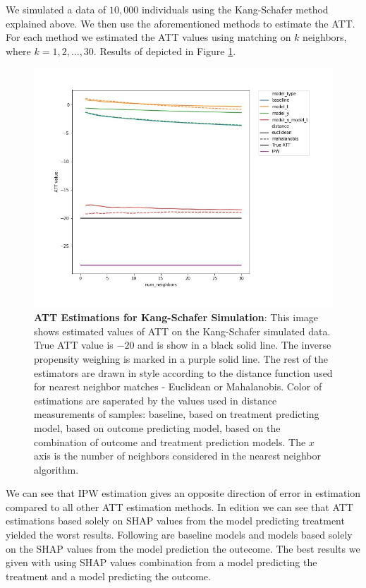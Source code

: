 \documentclass{article}
\begin{document}

We simulated a data of $10,000$ individuals using the Kang-Schafer method explained above. We then use the aforementioned methods to estimate the ATT. For each method we estimated the ATT values using matching on $k$ neighbors, where $k=1,2,...,30$. Results of depicted in Figure \ref{fig:kang_schafer}.

\begin{figure}
    \centering
    \includegraphics[width=\textwidth]{Paper/images/kang_schafer_ATE_estimations_by_neighbor.jpg}
    \caption{\textbf{ATT Estimations for Kang-Schafer Simulation}: This image shows estimated values of ATT on the Kang-Schafer simulated data. True ATT value is $-20$ and is show in a black solid line. The inverse propensity weighing is marked in a purple solid line. The rest of the estimators are drawn in style according to the distance function used for nearest neighbor matches - Euclidean or Mahalanobis. Color of estimations are saperated by the values used in distance measurements of samples: baseline, based on treatment predicting model, based on outcome predicting model, based on the combination of outcome and treatment prediction models. The $x$ axis is the number of neighbors considered in the nearest neighbor algorithm.}
    \label{fig:kang_schafer}
\end{figure}

We can see that IPW estimation gives an opposite direction of error in estimation compared to all other ATT estimation methods. In edition we can see that ATT estimations based solely on SHAP values from the model predicting treatment yielded the worst results. Following are baseline models and models based solely on the SHAP values from the model prediction the outecome. The best results we given with using SHAP values combination from a model predicting the treatment and a model predicting the outcome. 
\end{document}
